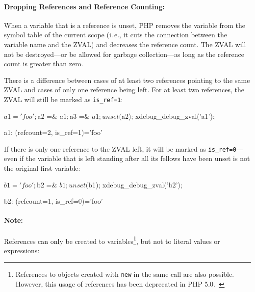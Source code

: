 \paragraph{Dropping References and Reference Counting:}

When a variable that is a reference is unset, PHP removes the variable from the symbol table of the current scope (i.\,e., it cuts the connection between the variable name and the ZVAL) and decreases the reference count. The ZVAL will not be destroyed---or be allowed for garbage collection---as long as the reference count is greater than zero.

There is a difference between cases of at least two references pointing to the same ZVAL and cases of only one reference being left. For at least two references, the ZVAL will still be marked as \texttt{is\_ref=1}:

\begin{phpcode}
$a1 = 'foo';
$a2 =& $a1;
$a3 =& $a1;
unset($a2);
xdebug_debug_zval('a1');
\end{phpcode}

\begin{textcode}
a1: (refcount=2, is_ref=1)='foo'
\end{textcode}

If there is only one reference to the ZVAL left, it will be marked as \texttt{is\_ref=0}---even if the variable that is left standing after all its fellows have been unset is not the original first variable:

\begin{phpcode}
$b1 = 'foo';
$b2 =& $b1;
unset($b1);
xdebug_debug_zval('b2');
\end{phpcode}

\begin{textcode}
b2: (refcount=1, is_ref=0)='foo'
\end{textcode}

\paragraph{Note:} References can only be created to variables\footnote{References to objects created with \texttt{new} in the same call are also possible. However, this usage of references has been deprecated in PHP 5.0.~\cite{php-manual-what-references-do}}, but not to literal values or expressions:



